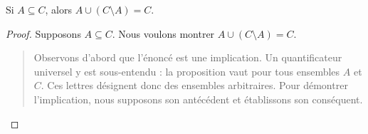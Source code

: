 \documentclass[../../../include/open-logic-section]{subfiles}
\begin{document}


\begin{prop}
Si $A \subseteq C$, alors
$A \cup (C \setminus A) = C$.
\end{prop}

\begin{proof}
  Supposons $A \subseteq C$. Nous voulons
  montrer $A \cup (C \setminus A) = C$.
  \begin{quote}
    Observons d'abord que l'énoncé est une
    implication. Un quantificateur universel
    y est sous-entendu : la proposition vaut
    pour tous ensembles $A$ et $C$. Ces lettres
    désignent donc des ensembles arbitraires.
    Pour démontrer l'implication, nous supposons
    son antécédent et établissons son conséquent.


\end{quote}
\end{proof}
\end{document}
